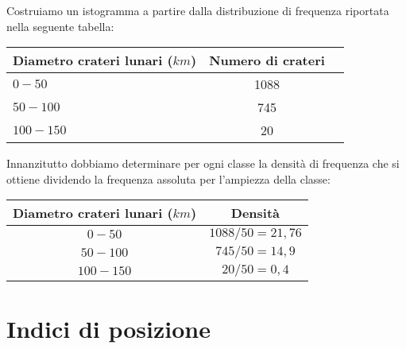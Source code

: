  \begin{esempio}

Costruiamo un istogramma a partire dalla distribuzione di frequenza 
riportata nella seguente tabella:
\begin{center}
\begin{tabular}{lcc}
\toprule
Diametro crateri lunari ($\unit{km}$) & Numero di crateri\\
\midrule
$0-50$ & 1088 \\
$50-100$ & 745 \\
$100-150$ & 20 \\
\bottomrule
\end{tabular}
\end{center}

Innanzitutto dobbiamo determinare per ogni classe la densità di frequenza 
che si ottiene dividendo la frequenza assoluta per l'ampiezza della classe:

\begin{center}
\begin{minipage}{.6\textwidth}
\begin{tabular}{cc}
\toprule
Diametro crateri lunari ($\unit{km}$) & Densità\\
\midrule
$0-50$ & $1088/50=21,76$ \\
$50-100$ & $745/50=14,9$ \\
$100-150$ & $20/50=0,4$ \\
\bottomrule
\end{tabular}
\end{minipage} 
\begin{minipage}{.38\textwidth}
\begin{inaccessibleblock}
\scalebox{.7}{}
\end{inaccessibleblock}
\end{minipage}
\end{center}

\end{esempio}



\section{Indici di posizione}
\label{sec:c_stat_posizione}

